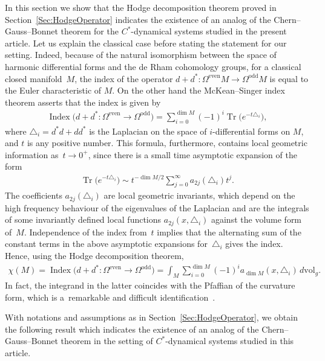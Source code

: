 \documentclass[pdftex]{sigma}
\DeclareMathOperator{\ind}{Index}
\DeclareMathOperator{\Tr}{Tr}
\numberwithin{equation}{section}
\begin{document}
In this section we show that the Hodge decomposition theorem proved in Section~\ref{Sec:HodgeOperator}
indicates the existence of an analog of the Chern--Gauss--Bonnet
theorem for the $C^*$-dynamical systems
studied in the present article. Let us explain the classical case
before stating the statement for our setting. Indeed, because of the natural
isomorphism between the space of harmonic dif\/ferential
forms and the de Rham cohomology groups, for a classical
closed manifold~$M$, the index of the operator
$d+d^*\colon \Omega^\text{even} M \to \Omega^\text{odd} M$ is
equal to the Euler characteristic of $M$. On the other
hand the McKean--Singer index theorem asserts that the index is
given by
\begin{gather*}
\ind\big(d+d^*\colon \Omega^\text{even} \to \Omega^\text{odd} \big)=\sum_{i=0}^{\dim M} (-1)^i\Tr \big(e^{-t \triangle_i}\big),
\end{gather*}
where $\triangle_i = d^* d + d d^*$ is the Laplacian on the
space of $i$-dif\/ferential forms on $M$, and $t$ is any positive number.
This formula, furthermore, contains local geometric information as~$t \to 0^+$,
since there is a small time asymptotic expansion of the form
\begin{gather*}
\Tr \big(e^{-t \triangle_i}\big)
\sim
t^{- \dim M/2} \sum_{j=0}^\infty a_{2j}(\triangle_i) t^j.
\end{gather*}
The coef\/f\/icients $a_{2j}(\triangle_i)$ are local geometric invariants,
which depend on the high frequency behaviour of the eigenvalues of the
Laplacian and are the integrals of some invariantly def\/ined local functions
$a_{2j}(x, \triangle_i)$ against the volume form of~$M$.
Independence of the index from~$t$ implies that the alternating sum of the
constant terms in the above asymptotic expansions for~$\triangle_i$ gives the
index. Hence, using the Hodge decomposition theorem,
\begin{gather*}
\chi(M)=\ind\big(d+d^*\colon \Omega^\text{even} \to \Omega^\text{odd} \big)
=
\int_M \sum_{i=0}^{\dim M} (-1)^ia_{\dim M}(x,\triangle_i) \, d \text{vol}_g.
\end{gather*}
In fact, the integrand in the latter coincides with the Pfaf\/f\/ian of the
curvature form, which is a~remarkable and dif\/f\/icult identif\/ication~\cite{HeatEquationABP}.

With notations and assumptions as in Section~\ref{Sec:HodgeOperator}, we obtain the following
result which indicates the existence of an analog of the Chern--Gauss--Bonnet theorem
in the setting of $C^*$-dynamical systems studied in this article.
\end{document}
